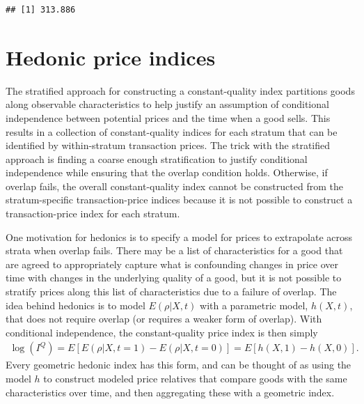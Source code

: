 \documentclass[]{article}
\begin{document}
\begin{verbatim}
## [1] 313.886
\end{verbatim}

\hypertarget{hedonic-price-indices}{%
\section{Hedonic price indices}\label{hedonic-price-indices}}

The stratified approach for constructing a constant-quality index partitions goods along observable characteristics to help justify an assumption of conditional independence between potential prices and the time when a good sells. This results in a collection of constant-quality indices for each stratum that can be identified by within-stratum transaction prices. The trick with the stratified approach is finding a coarse enough stratification to justify conditional independence while ensuring that the overlap condition holds. Otherwise, if overlap fails, the overall constant-quality index cannot be constructed from the stratum-specific transaction-price indices because it is not possible to construct a transaction-price index for each stratum.

One motivation for hedonics is to specify a model for prices to extrapolate across strata when overlap fails. There may be a list of characteristics for a good that are agreed to appropriately capture what is confounding changes in price over time with changes in the underlying quality of a good, but it is not possible to stratify prices along this list of characteristics due to a failure of overlap. The idea behind hedonics is to model \(E(\rho | X, t)\) with a parametric model, \(h(X, t)\), that does not require overlap (or requires a weaker form of overlap). With conditional independence, the constant-quality price index is then simply
\begin{align*}
\log(I^{Q}) = E[E(\rho | X, t = 1) - E(\rho | X, t = 0)] = E[h(X, 1) - h(X, 0)].
\end{align*}
Every geometric hedonic index has this form, and can be thought of as using the model \(h\) to construct modeled price relatives that compare goods with the same characteristics over time, and then aggregating these with a geometric index.
\end{document}
